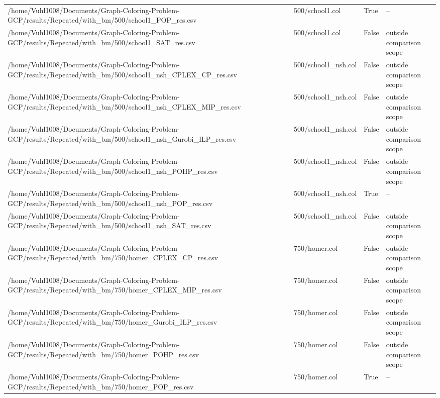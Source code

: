 \begin{table}[htbp]
\begin{tabular}{llll}
/home/Vuhl1008/Documents/Graph-Coloring-Problem-GCP/results/Repeated/with\_bm/500/school1\_POP\_res.csv & 500/school1.col & True & -- \\
/home/Vuhl1008/Documents/Graph-Coloring-Problem-GCP/results/Repeated/with\_bm/500/school1\_SAT\_res.csv & 500/school1.col & False & outside comparison scope \\
/home/Vuhl1008/Documents/Graph-Coloring-Problem-GCP/results/Repeated/with\_bm/500/school1\_nsh\_CPLEX\_CP\_res.csv & 500/school1\_nsh.col & False & outside comparison scope \\
/home/Vuhl1008/Documents/Graph-Coloring-Problem-GCP/results/Repeated/with\_bm/500/school1\_nsh\_CPLEX\_MIP\_res.csv & 500/school1\_nsh.col & False & outside comparison scope \\
/home/Vuhl1008/Documents/Graph-Coloring-Problem-GCP/results/Repeated/with\_bm/500/school1\_nsh\_Gurobi\_ILP\_res.csv & 500/school1\_nsh.col & False & outside comparison scope \\
/home/Vuhl1008/Documents/Graph-Coloring-Problem-GCP/results/Repeated/with\_bm/500/school1\_nsh\_POHP\_res.csv & 500/school1\_nsh.col & False & outside comparison scope \\
/home/Vuhl1008/Documents/Graph-Coloring-Problem-GCP/results/Repeated/with\_bm/500/school1\_nsh\_POP\_res.csv & 500/school1\_nsh.col & True & -- \\
/home/Vuhl1008/Documents/Graph-Coloring-Problem-GCP/results/Repeated/with\_bm/500/school1\_nsh\_SAT\_res.csv & 500/school1\_nsh.col & False & outside comparison scope \\
/home/Vuhl1008/Documents/Graph-Coloring-Problem-GCP/results/Repeated/with\_bm/750/homer\_CPLEX\_CP\_res.csv & 750/homer.col & False & outside comparison scope \\
/home/Vuhl1008/Documents/Graph-Coloring-Problem-GCP/results/Repeated/with\_bm/750/homer\_CPLEX\_MIP\_res.csv & 750/homer.col & False & outside comparison scope \\
/home/Vuhl1008/Documents/Graph-Coloring-Problem-GCP/results/Repeated/with\_bm/750/homer\_Gurobi\_ILP\_res.csv & 750/homer.col & False & outside comparison scope \\
/home/Vuhl1008/Documents/Graph-Coloring-Problem-GCP/results/Repeated/with\_bm/750/homer\_POHP\_res.csv & 750/homer.col & False & outside comparison scope \\
/home/Vuhl1008/Documents/Graph-Coloring-Problem-GCP/results/Repeated/with\_bm/750/homer\_POP\_res.csv & 750/homer.col & True & -- \\

\end{tabular}
\end{table}
